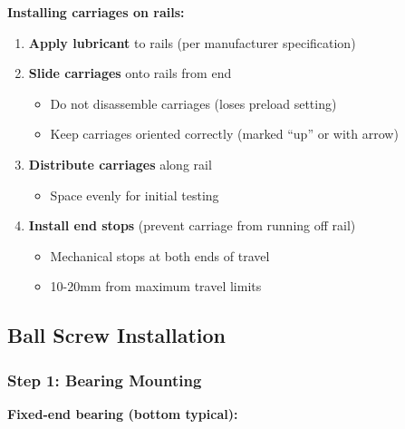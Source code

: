 \documentclass[
]{article}
\providecommand{\tightlist}{%
  \setlength{\itemsep}{0pt}\setlength{\parskip}{0pt}}
\begin{document}
\textbf{Installing carriages on rails:}

\begin{enumerate}
\def\labelenumi{\arabic{enumi}.}
\tightlist
\item
  \textbf{Apply lubricant} to rails (per manufacturer specification)
\item
  \textbf{Slide carriages} onto rails from end

  \begin{itemize}
  \tightlist
  \item
    Do not disassemble carriages (loses preload setting)
  \item
    Keep carriages oriented correctly (marked ``up'' or with arrow)
  \end{itemize}
\item
  \textbf{Distribute carriages} along rail

  \begin{itemize}
  \tightlist
  \item
    Space evenly for initial testing
  \end{itemize}
\item
  \textbf{Install end stops} (prevent carriage from running off rail)

  \begin{itemize}
  \tightlist
  \item
    Mechanical stops at both ends of travel
  \item
    10-20mm from maximum travel limits
  \end{itemize}
\end{enumerate}

\subsection{Ball Screw Installation}\label{ball-screw-installation}

\subsubsection{Step 1: Bearing Mounting}\label{step-1-bearing-mounting}

\textbf{Fixed-end bearing (bottom typical):}
\end{document}
